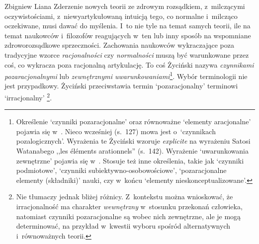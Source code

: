 \begin{artplenv}{Zbigniew Liana}
Zderzenie nowych teorii ze zdrowym rozsądkiem, z~milczącymi oczywistościami, z~niewyartykułowaną intuicją tego, co
normalne i~milcząco oczekiwane, musi dawać do myślenia. I~to nie tyle na temat samych teorii, ile na temat naukowców i~filozofów
reagujących w~ten lub inny sposób na wspomniane zdroworozsądkowe sprzeczności. Zachowania naukowców
wykraczające poza tradycyjne wzorce \textit{racjonalności} czy \textit{normalności} muszą być warunkowane przez coś, co
wykracza poza racjonalną artykulację. To coś Życiński nazywa \textit{czynnikami pozaracjonalnymi} lub \textit{zewnętrznymi
uwarunkowaniami}\footnote{Określenie `czynniki pozaracjonalne' oraz równoważne `elementy aracjonalne' pojawia
się
w~\parencite[s.~142]{zycinski_jezyk_1983}.
Nieco wcześniej
(s.~127)
mowa jest o~`czynnikach pozalogicznych'. Wyrażenia te Życiński
wzoruje \textit{explicite} na wyrażeniu Satosi Watanabego ,,les éléments arationnels''
(s.~142).
Wyrażenie `uwarunkowania zewnętrzne' pojawia się
w~\parencites[s.~130]{zycinski_structure_1988}[s.~230]{zycinski_struktura_2013}.
Stosuje też inne określenia, takie jak `czynniki
podmiotowe', `czynniki subiektywno-osobowościowe', `pozaracjonalne elementy\textit{ }(składniki)' nauki, czy w~końcu
`elementy nieskonceptualizowane'.}. Wybór terminologii nie jest przypadkowy. Życiński przeciwstawia termin
`pozaracjonalny' terminowi `irracjonalny' 
\parencites[zob.][s.~137]{zycinski_structure_1988}[s.~242]{zycinski_struktura_2013}\footnote{%
Nie tłumaczy jednak bliżej różnicy. Z~kontekstu można wnioskować, że irracjonalność ma charakter
\textit{wewnętrzny} w~stosunku przekonań człowieka, natomiast czynniki pozaracjonalne są wobec nich zewnętrzne, ale je mogą determinować,
na przykład w~kwestii wyboru spośród alternatywnych i~równoważnych teorii.}.


\end{artplenv}
